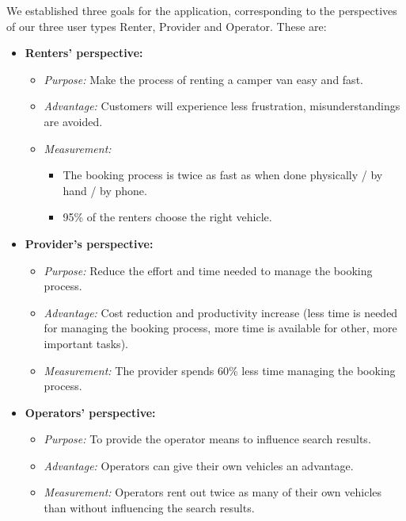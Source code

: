 We established three goals for the application, corresponding to the perspectives of our three user types Renter, Provider and Operator. These are:

\begin{itemize}
    \item \textbf{Renters’ perspective:}
    \begin{itemize}
        \item \textit{Purpose:} Make the process of renting a camper van easy and fast.
        \item \textit{Advantage:} Customers will experience less frustration, misunderstandings are avoided.
        \item \textit{Measurement:}
        \begin{itemize}
            \item The booking process is twice as fast as when done physically / by hand / by phone.
            \item 95\% of the renters choose the right vehicle.
        \end{itemize}
    \end{itemize}
    \item \textbf{Provider’s perspective:}
    \begin{itemize}
        \item \textit{Purpose:} Reduce the effort and time needed to manage the booking process.
        \item \textit{Advantage:} Cost reduction and productivity increase (less time is needed for managing the booking process, more time is available for other, more important tasks).
        \item \textit{Measurement:} The provider spends 60\% less time managing the booking process.
    \end{itemize}
    \item \textbf{Operators’ perspective:}
    \begin{itemize}
        \item \textit{Purpose:} To provide the operator means to influence search results.
        \item \textit{Advantage:} Operators can give their own vehicles an advantage.
        \item \textit{Measurement:} Operators rent out twice as many of their own vehicles than without influencing the search results.
    \end{itemize}
\end{itemize}
